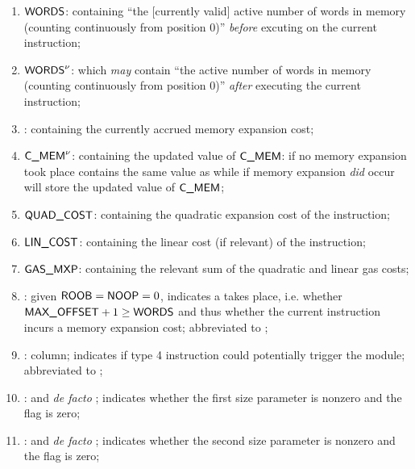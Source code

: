 \begin{enumerate}[resume]
	\item $\textsf{WORDS}$: \godGiven{}
	      \ccc{} containing ``the [currently valid] active number of words in memory (counting continuously from position $0$)'' \emph{before} excuting on the current instruction;
	\item $\textsf{WORDS}^{\nu}$:
	      \ccc{} which \emph{may} contain ``the active number of words in memory (counting continuously from position $0$)'' \emph{after} executing the current instruction;
	\item \expCost:
	      \ccc{} containing the currently accrued memory expansion cost;
	\item $\textsf{C\_MEM}^{\nu}$:
	      \ccc{} containing the updated value of $\textsf{C\_MEM}$: if no memory expansion took place contains the same value as \expCost{} while if memory expansion \emph{did} occur will store the updated value of $\textsf{C\_MEM}$;
	\item $\textsf{QUAD\_COST}$:
	      \ccc{} containing the quadratic expansion cost of the instruction;
	\item $\textsf{LIN\_COST}$:
	      \ccc{} containing the linear cost (if relevant) of the instruction;
	\item $\textsf{GAS}\textsf{\_MXP}$: \godGiven{}
	      \ccc{} containing the relevant sum of the quadratic and linear gas costs;
	\item \mexpEvent{}:
	      given $\textsf{ROOB} = \textsf{NOOP} = 0$, indicates a \MEXPEVENT{} takes place, i.e. whether $\textsf{MAX\_\textsf{OFFSET}} + 1 \geq \textsf{WORDS}$ and thus whether the current instruction incurs a memory expansion cost; abbreviated to \mexpEvent{};
	\item \YNMO{}:
		  \godGiven{} column; indicates if type 4 instruction could potentially trigger the \mmuMod{} module;
		  abbreviated to \mayTriggerNonTrivialOperation{};
	\item \both{\sizeOneNonzeroNoMxpx}:
		\godGiven{} and \emph{de facto} \ccbc{};
		indicates whether the first size parameter is nonzero and the \mxpx{} flag is zero;
	\item \both{\sizeTwoNonzeroNoMxpx}:
		\godGiven{} and \emph{de facto} \ccbc{};
		indicates whether the second size parameter is nonzero and the \mxpx{} flag is zero;
\end{enumerate}


